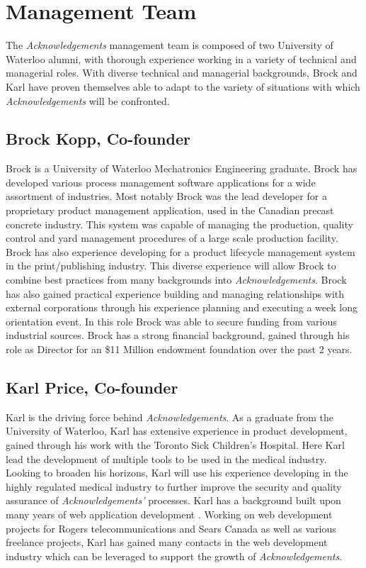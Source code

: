 \section{Management Team}

The {\it Acknowledgements} management team is composed of two University of Waterloo alumni, with thorough experience working in a variety of technical and managerial roles. With diverse technical and managerial backgrounds, Brock and Karl have proven themselves able to adapt to the variety of situations with which {\it Acknowledgements} will be confronted.

\subsection{Brock Kopp, Co-founder}
Brock is a University of Waterloo Mechatronics Engineering graduate. Brock has developed various process management software applications for a wide assortment of industries. Most notably Brock was the lead developer for a proprietary product management application, used in the Canadian precast concrete industry. This system was capable of managing the production, quality control and yard management procedures of a large scale production facility. Brock has also experience developing for a product lifecycle management system in the print/publishing industry. This diverse experience will allow Brock to combine best practices from many backgrounds into {\it Acknowledgements}. Brock has also gained practical experience building and managing relationships with external corporations through his experience planning and executing a week long orientation event. In this role Brock was able to secure funding from various industrial sources. Brock has a strong financial background, gained through his role as Director for an \$11 Million endowment foundation over the past 2 years.

\subsection{Karl Price, Co-founder}
Karl is the driving force behind {\it Acknowledgements}. As a graduate from the University of Waterloo, Karl has extensive experience in product development, gained through his work with the Toronto Sick Children's Hospital. Here Karl lead the development of multiple tools to be used in the medical industry. Looking to broaden his horizons, Karl will use his experience developing in the highly regulated medical industry to further improve the security and quality assurance of {\it Acknowledgements'} processes. Karl has a background built upon many years of web application development . Working on web development projects for Rogers telecommunications and Sears Canada as well as various freelance projects, Karl has gained many contacts in the web development industry which can be leveraged to support the growth of {\it Acknowledgements}.


